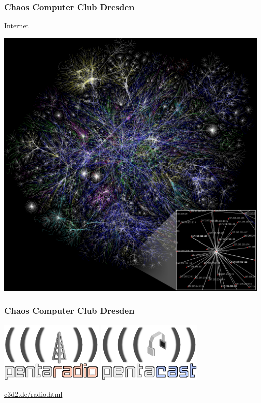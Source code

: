 \documentclass[12pt]{beamer}
\begin{document}
\begin{frame}	
	\frametitle{Chaos Computer Club Dresden}
	\begin{center}
		Internet
		\vspace{0.4cm}	

		\includegraphics[height=0.6\textheight]{img/internet_0.jpg}
	\end{center}
\end{frame}	

\begin{frame}	
	\frametitle{Chaos Computer Club Dresden}
	\begin{center}
		\includegraphics[height=0.2\textheight]{img/pentaradio.png}	
		\hspace{0.4cm}		
		\includegraphics[height=0.2\textheight]{img/pentacast.png}	
		\vspace{0.4cm}

		\underline{c3d2.de/radio.html}
	\end{center}
\end{frame}	
\end{document}
